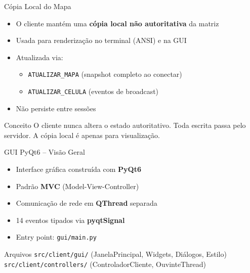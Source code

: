 \documentclass[aspectratio=169]{beamer}
\begin{document}
\begin{frame}{C\'opia Local do Mapa}
  \begin{itemize}
    \item O cliente mant\'em uma \textbf{c\'opia local n\~ao autoritativa} da matriz
    \item Usada para renderiza\c{c}\~ao no terminal (ANSI) e na GUI
    \item Atualizada via:
    \begin{itemize}
      \item \texttt{ATUALIZAR\_MAPA} (snapshot completo ao conectar)
      \item \texttt{ATUALIZAR\_CELULA} (eventos de broadcast)
    \end{itemize}
    \item N\~ao persiste entre sess\~oes
  \end{itemize}
  \vfill
  \begin{alertblock}{Conceito}
    O cliente nunca altera o estado autoritativo. Toda escrita passa pelo servidor. A c\'opia local \'e apenas para visualiza\c{c}\~ao.
  \end{alertblock}
\end{frame}

\begin{frame}{GUI PyQt6 -- Vis\~ao Geral}
  \begin{itemize}
    \item Interface gr\'afica constru\'ida com \textbf{PyQt6}
    \item Padr\~ao \textbf{MVC} (Model-View-Controller)
    \item Comunica\c{c}\~ao de rede em \textbf{QThread} separada
    \item 14 eventos tipados via \textbf{pyqtSignal}
    \item Entry point: \texttt{gui/main.py}
  \end{itemize}
  \vfill
  \begin{block}{Arquivos}
    \texttt{src/client/gui/} (JanelaPrincipal, Widgets, Di\'alogos, Estilo) \\
    \texttt{src/client/controllers/} (ControladorCliente, OuvinteThread)
  \end{block}
\end{frame}
\end{document}
